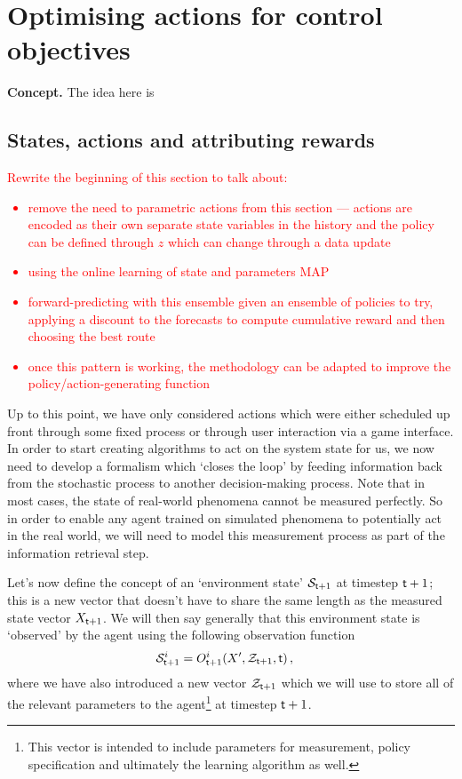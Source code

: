 \chapter{\sffamily Optimising actions for control objectives}

{\bfseries\sffamily Concept.} The idea here is 

\section{\sffamily States, actions and attributing rewards}

\textcolor{red}{Rewrite the beginning of this section to talk about:
\begin{itemize}
\item{remove the need to parametric actions from this section --- actions are encoded as their own separate state variables in the history and the policy can be defined through $z$ which can change through a data update}
\item{using the online learning of state and parameters MAP}
\item{forward-predicting with this ensemble given an ensemble of policies to try, applying a discount to the forecasts to compute cumulative reward and then choosing the best route}
\item{once this pattern is working, the methodology can be adapted to improve the policy/action-generating function}    
\end{itemize}
}

Up to this point, we have only considered actions which were either scheduled up front through some fixed process or through user interaction via a game interface. In order to start creating algorithms to act on the system state for us, we now need to develop a formalism which `closes the loop' by feeding information back from the stochastic process to another decision-making process. Note that in most cases, the state of real-world phenomena cannot be measured perfectly. So in order to enable any agent trained on simulated phenomena to potentially act in the real world, we will need to model this measurement process as part of the information retrieval step.

Let's now define the concept of an `environment state' ${\cal S}_{{\sf t}+1}$ at timestep ${\sf t}+1$; this is a new vector that doesn't have to share the same length as the measured state vector $X_{{\sf t}+1}$. We will then say generally that this environment state is `observed' by the agent using the following observation function
\begin{align}
{\cal S}_{{\sf t}+1}^i &= O_{{\sf t}+1}^i(X',{\cal Z}_{{\sf t}+1},{\sf t}) \label{eq:generalised-state-measurement} \,,
\end{align}
where we have also introduced a new vector ${\cal Z}_{{\sf t}+1}$ which we will use to store all of the relevant parameters to the agent\footnote{This vector is intended to include parameters for measurement, policy specification and ultimately the learning algorithm as well.} at timestep ${\sf t}+1$.

